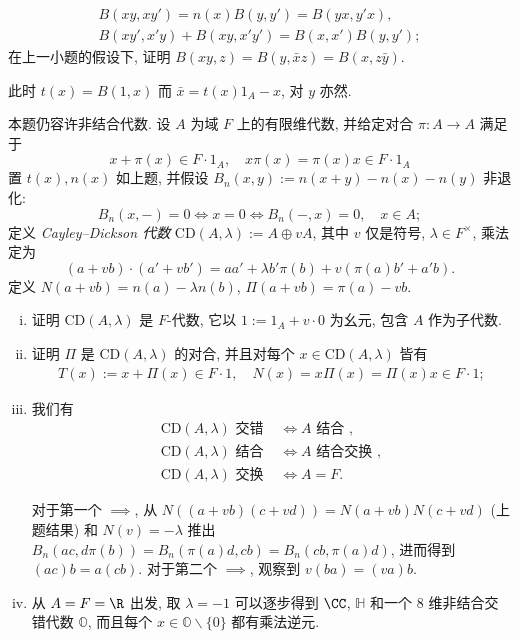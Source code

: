 \begin{Exercises}
\begin{enumerate}[(i)]
				\begin{align*}
					B(xy,xy') = n(x)B(y,y') = B(yx,y'x), \\
					B(xy', x'y) + B(xy, x'y') = B(x,x')B(y,y');
				\end{align*}
				在上一小题的假设下, 证明 $B(xy,z) = B(y,\bar{x}z) = B(x, z\bar{y})$. \begin{hint} 此时 $t(x) = B(1,x)$ 而 $\bar{x} = t(x) 1_A - x$, 对 $y$ 亦然.\end{hint}
		\end{enumerate}
	\item 本题仍容许非结合代数. 设 $A$ 为域 $F$ 上的有限维代数, 并给定对合 $\pi: A \to A$ 满足于
		\[ x + \pi(x) \in F \cdot 1_A, \quad x\pi(x) = \pi(x) x \in F \cdot 1_A \]
		置 $t(x), n(x)$ 如上题, 并假设 $B_n(x,y) := n(x+y) - n(x) - n(y)$ 非退化:
		\[ B_n(x,-) = 0 \iff x = 0 \iff B_n(-,x)=0, \quad x \in A; \]
		定义 \emph{Cayley--Dickson 代数} $\text{CD}(A, \lambda) := A \oplus vA$, 其中 $v$ 仅是符号, $\lambda \in F^{\times}$, 乘法定为
		\[ (a + vb) \cdot (a' + vb') = aa' + \lambda b' \pi(b) + v \left( \pi(a)b' + a'b \right). \]
		定义 $N(a+vb) = n(a) - \lambda n(b)$, $\Pi(a+vb) = \pi(a) - vb$.
		\begin{enumerate}[(i)]
			\item 证明 $\text{CD}(A, \lambda)$ 是 $F$-代数, 它以 $1 := 1_A + v \cdot 0$ 为幺元, 包含 $A$ 作为子代数.
			\item 证明 $\Pi$ 是 $\text{CD}(A, \lambda)$ 的对合, 并且对每个 $x \in \text{CD}(A, \lambda)$ 皆有
				\begin{gather*}
					T(x) := x + \Pi(x) \in F \cdot 1, \quad N(x) = x\Pi(x) = \Pi(x) x \in F \cdot 1;
				\end{gather*}
			\item 我们有
				\begin{align*}
					\text{CD}(A, \lambda) \text{ 交错} & \iff A \text { 结合 }, \\
					\text{CD}(A, \lambda) \text{ 结合 } & \iff A \text { 结合交换 }, \\
					\text{CD}(A, \lambda) \text{ 交换 } & \iff A=F.
				\end{align*}
				\begin{hint} 对于第一个 $\implies$, 从 $N((a+vb)(c+vd)) = N(a+vb)N(c+vd)$ (上题结果) 和 $N(v)=-\lambda$ 推出 $B_n(ac, d\pi(b)) = B_n(\pi(a)d, cb) = B_n(cb, \pi(a)d)$, 进而得到 $(ac)b = a(cb)$. 对于第二个 $\implies$, 观察到 $v(ba) = (va)b$. \end{hint}
			\item 从 $A=F=\R$ 出发, 取 $\lambda=-1$ 可以逐步得到 $\CC$, $\mathbb{H}$ 和一个 $8$ 维非结合交错代数 $\mathbb{O}$, 而且每个 $x \in \mathbb{O} \smallsetminus \{0\}$ 都有乘法逆元.

\end{enumerate}
\end{Exercises}
